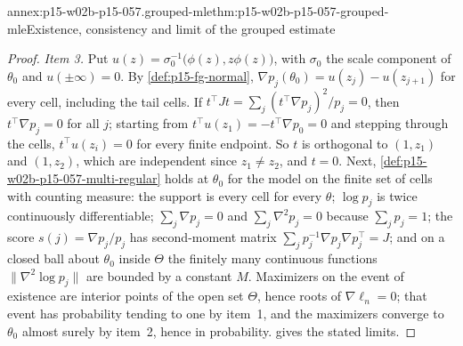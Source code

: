 \begin{annexitem}{annex:p15-w02b-p15-057.grouped-mle}{thm:p15-w02b-p15-057-grouped-mle}{Existence, consistency and limit of the grouped estimate}
\begin{proof}
\emph{Item 3.} Put \(u(z)=\sigma_0^{-1}\bigl(\phi(z),z\phi(z)\bigr)\), with
\(\sigma_0\) the scale component of \(\theta_0\) and
\(u(\pm\infty)=0\). By \cref{def:p15-fg-normal},
\(\nabla p_j(\theta_0)=u(z_j)-u(z_{j+1})\) for every cell, including the
tail cells. If \(t^{\top}Jt=\sum_j(t^{\top}\nabla p_j)^2/p_j=0\), then
\(t^{\top}\nabla p_j=0\) for all \(j\); starting from
\(t^{\top}u(z_1)=-t^{\top}\nabla p_0=0\) and stepping through the cells,
\(t^{\top}u(z_i)=0\) for every finite endpoint. So \(t\) is orthogonal to
\((1,z_1)\) and \((1,z_2)\), which are independent since \(z_1\neq z_2\),
and \(t=0\). Next, \cref{def:p15-w02b-p15-057-multi-regular} holds at
\(\theta_0\) for the model on the finite set of cells with counting
measure: the support is every cell for every \(\theta\);
\(\log p_j\) is twice continuously differentiable; \(\sum_j\nabla p_j=0\)
and \(\sum_j\nabla^2p_j=0\) because \(\sum_jp_j=1\); the score
\(s(j)=\nabla p_j/p_j\) has second-moment matrix
\(\sum_jp_j^{-1}\nabla p_j\nabla p_j^{\top}=J\); and on a closed ball about
\(\theta_0\) inside \(\Theta\) the finitely many continuous functions
\(\|\nabla^2\log p_j\|\) are bounded by a constant \(M\). Maximizers on the
event of existence are interior points of the open set \(\Theta\), hence
roots of \(\nabla\ell_n=0\); that event has probability tending to one by
item~1, and the maximizers converge to \(\theta_0\) almost surely by
item~2, hence in probability. 
gives the stated limits.
\end{proof}
\end{annexitem}

